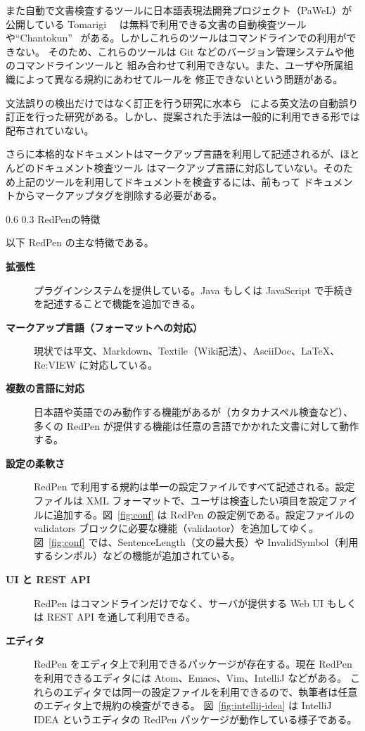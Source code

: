 \documentclass[a4j,twocolumn]{jarticle}
\makeatletter
\def\section{\@startsection{section}{1}{\z@}%
   {0.6\Cvs}%
   {0.3\Cvs}%
   {\reset@font\fontsize{10.5pt}{0pt}\bfseries}}
\makeatother
\begin{document}
また自動で文書検査するツールに日本語表現法開発プロジェクト（PaWeL）が公開している
 Tomarigi~\cite{tomarigi}~\cite{tomarigi-paper} は無料で利用できる文書の自動検査ツール
や``Chantokun''~\cite{chantokun} がある。しかしこれらのツールはコマンドラインでの利用ができない。
そのため、これらのツールは Git などのバージョン管理システムや他のコマンドラインツールと
組み合わせて利用できない。また、ユーザや所属組織によって異なる規約にあわせてルールを
修正できないという問題がある。

文法誤りの検出だけではなく訂正を行う研究に水本ら~\cite{mizumoto12english} による英文法の自動誤り
訂正を行った研究がある。しかし、提案された手法は一般的に利用できる形では配布されていない。

さらに本格的なドキュメントはマークアップ言語を利用して記述されるが、ほとんどのドキュメント検査ツール
はマークアップ言語に対応していない。そのため上記のツールを利用してドキュメントを検査するには、前もって
ドキュメントからマークアップタグを削除する必要がある。

\section{RedPenの特徴}

以下 RedPen の主な特徴である。

\begin{description}

\item[{\bf 拡張性}]
   プラグインシステムを提供している。Java もしくは JavaScript で手続きを記述することで機能を追加できる。

 \item[{\bf マークアップ言語（フォーマットへの対応）}]
  現状では平文、Markdown、Textile（Wiki記法）、AsciiDoc、LaTeX、Re:VIEW に対応している。

\item[{\bf 複数の言語に対応}]
  日本語や英語でのみ動作する機能があるが（カタカナスペル検査など）、多くの RedPen が提供する機能は任意の言語でかかれた文書に対して動作する。

\item[{\bf 設定の柔軟さ}]
  RedPen で利用する規約は単一の設定ファイルですべて記述される。設定ファイルは XML フォーマットで、ユーザは検査したい項目を設定ファイルに追加する。図~\ref{fig:conf} は RedPen の設定例である。設定ファイルの validators ブロックに必要な機能（validaotor）を追加してゆく。図~\ref{fig:conf} では、SentenceLength（文の最大長）や InvalidSymbol（利用するシンボル）などの機能が追加されている。

\item[{\bf UI と REST API}]
  RedPen はコマンドラインだけでなく、サーバが提供する Web UI もしくは REST API を通して利用できる。

\item[{\bf エディタ}]
  RedPen をエディタ上で利用できるパッケージが存在する。現在 RedPen を利用できるエディタには Atom、Emacs、Vim、IntelliJ などがある。
  これらのエディタでは同一の設定ファイルを利用できるので、執筆者は任意のエディタ上で規約の検査ができる。
  図~\ref{fig:intellij-idea} は IntelliJ IDEA というエディタの RedPen パッケージが動作している様子である。

\end{description}
\end{document}
